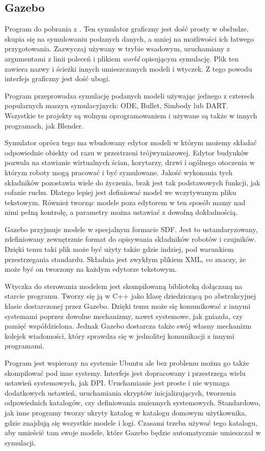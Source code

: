 \subsection{Gazebo}
Program do pobrania z \cite{gazebo_website}. Ten symulator graficzny jest dość prosty w obsłudze, skupia się na symulowaniu podanych danych, a mniej na możliwości ich łatwego przygotowania.
Zazwyczaj używany w trybie wsadowym, uruchamiany z argumentami z linii poleceń i plikiem \emph{world} opisującym symulację.
Plik ten zawiera nazwy i ścieżki innych umieszczanych modeli i wtyczek.
Z tego powodu interfejs graficzny jest dość ubogi.

Program przeprowadza symulację podanych modeli używając jednego z czterech popularnych maszyn symulacyjnych: ODE, Bullet, Simbody lub DART.
Wszystkie te projekty są wolnym oprogramowaniem i używane są także w innych programach, jak Blender.

Symulator oprócz tego ma wbudowany edytor modeli w którym możemy składać odpowiednie obiekty od razu w przestrzeni trójwymiarowej.
Edytor budynków pozwala na stawianie wirtualnych ścian, korytarzy, drzwi i ogólnego otoczenia w którym roboty mogą pracować i być symulowane.
Jakość wykonania tych składników pozostawia wiele do życzenia, brak jest tak podstawowych funkcji, jak cofanie ruchu.
Dlatego lepiej jest definiować model we wczytywanym pliku tekstowym.
Również tworząc modele poza edytorem w ten sposób mamy nad nimi pełną kontrolę, a parametry można ustawiać z dowolną dokładnością.

Gazebo przyjmuje modele w specjalnym formacie SDF. Jest to ustandaryzowany, zdefiniowany zewnętrznie format do opisywania składników robotów i czujników.
Dzięki temu taki plik może być użyty także gdzie indziej, pod warunkiem przestrzegania standardu.
Składnia jest zwykłym plikiem XML, co znaczy, że może być on tworzony na każdym edytorze tekstowym.

Wtyczka do sterowania modelem jest skompilowaną biblioteką dołączaną na starcie programu.
Tworzy się ją w C++ jako klasę dziedziczącą po abstrakcyjnej klasie dostarczonej przez Gazebo.
Dzięki temu może się komunikować z innymi systemami poprzez dowolne mechanizmy, nawet systemowe, jak gniazda, czy pamięć współdzielona.
Jednak Gazebo dostarcza także swój własny mechanizm kolejek wiadomości, który sprawdza się w jednolitej komunikacji z innymi programami.

Program jest wspierany na systemie Ubuntu ale bez problemu można go także skompilować pod inne systemy.
Interfejs jest dopracowany i przestrzega wielu ustawień systemowych, jak DPI.
Uruchamianie jest proste i nie wymaga dodatkowych ustawień, uruchamiania skryptów inicjalizujących, tworzenia odpowiednich katalogów, czy definiowania zmiennych systemowych.
Standardowo, jak inne programy tworzy ukryty katalog w katalogu domowym użytkownika, gdzie znajdują się wszystkie modele i logi.
Czasami trzeba używać tego katalogu, aby umieścić tam swoje modele, które Gazebo będzie automatycznie umieszczał w symulacji.

